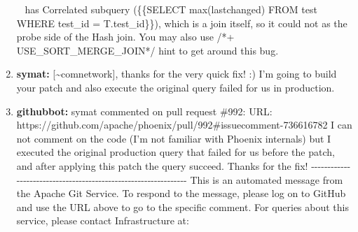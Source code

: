 \documentclass{report}%
\begin{document}
\begin{enumerate}
\begin{lstlisting}[language=java]
\end{lstlisting} \ \newline%
\newline%
\newline%
\newline%
has  Correlated subquery (\{\{SELECT max(lastchanged) FROM test WHERE test\_id = T.test\_id\}\}),  which is a join itself, so it could not as the probe side of the Hash join.\newline%
\newline%
\newline%
\newline%
You may also use /*+ USE\_SORT\_MERGE\_JOIN*/ hint to get around this bug.%
\item%
\textbf{symat: }{[}\textasciitilde{}comnetwork{]}, thanks for the very quick fix! :)\newline%
\newline%
\newline%
\newline%
I'm going to build your patch and also execute the original query failed for us in production.%
\item%
\textbf{githubbot: }symat commented on pull request \#992:\newline%
URL: https://github.com/apache/phoenix/pull/992\#issuecomment{-}736616782\newline%
\newline%
\newline%
   I can not comment on the code (I'm not familiar with Phoenix internals) but I executed the original production query that failed for us before the patch, and after applying this patch the query succeed. Thanks for the fix!\newline%
\newline%
\newline%
{-}{-}{-}{-}{-}{-}{-}{-}{-}{-}{-}{-}{-}{-}{-}{-}{-}{-}{-}{-}{-}{-}{-}{-}{-}{-}{-}{-}{-}{-}{-}{-}{-}{-}{-}{-}{-}{-}{-}{-}{-}{-}{-}{-}{-}{-}{-}{-}{-}{-}{-}{-}{-}{-}{-}{-}{-}{-}{-}{-}{-}{-}{-}{-}\newline%
This is an automated message from the Apache Git Service.\newline%
To respond to the message, please log on to GitHub and use the\newline%
URL above to go to the specific comment.\newline%
\newline%
For queries about this service, please contact Infrastructure at:\newline%

\end{enumerate}
\end{document}
